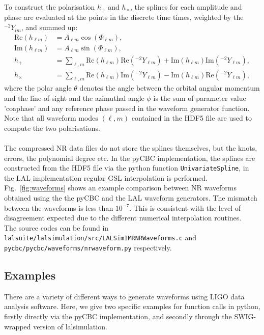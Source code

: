 \documentclass[aps,prd,amssymb,amsmath,amsfonts,superscriptaddress,
floatfix ,preprintnumbers,altaffilletter]{revtex4}
\begin{document}
To construct the polarisation $h_+$ and $h_\times$, the splines for each amplitude and phase are evaluated at the points in the discrete time times, 
weighted by the ${}^{-2}Y_{lm}$, and summed up:
\begin{align}
\label{}
    \mathrm{Re}(h_{\ell m}) &= A_{\ell m} \cos(\Phi_{\ell m}),   \\
    \mathrm{Im}(h_{\ell m}) &= A_{\ell m} \sin(\Phi_{\ell m}),   \\
    h_+ &= \sum_{\ell, m} \mathrm{Re}(h_{\ell m}) \mathrm{Re}({}^{-2}Y_{\ell m}) + \mathrm{Im}(h_{\ell m}) \mathrm{Im}({}^{-2}Y_{\ell m}), \\
    h_\times &= \sum_{\ell, m} \mathrm{Re}(h_{\ell m}) \mathrm{Im}({}^{-2}Y_{\ell m}) - \mathrm{Im}(h_{\ell m}) \mathrm{Re}({}^{-2}Y_{\ell m}),
\end{align}
where the polar angle $\theta$ denotes the angle between the orbital angular momentum and the line-of-sight and the azimuthal
angle $\phi$ is the sum of parameter value 'coa\textunderscore phase' and any reference phase passed in the waveform generator function.
\\
Note that all waveform modes $(\ell, m)$ contained in the HDF5 file are used
to compute the two polarisations. \\
\\
The compressed NR data files do not store the splines themselves, but the knots, errors, the polynomial degree etc. In the pyCBC implementation,
the splines are constructed from the HDF5 file via the python function \texttt{UnivariateSpline}, in the LAL implementation regular GSL interpolation
is performed. Fig.~\ref{fig:waveforms} shows an example comparison between NR waveforms obtained using the the pyCBC and the LAL waveform generators. The mismatch
between the waveforms is less than $10^{-7}$. This is consistent with the level of disagreement expected due to the different numerical interpolation
routines. \\
The source codes can be found in \texttt{lalsuite/lalsimulation/src/LALSimIMRNRWaveforms.c} and 
\texttt{pycbc/pycbc/waveforms/nr\textunderscore waveform.py} respectively.

\subsection{Examples}
There are a variety of different ways to generate waveforms using LIGO data analysis software. Here, we give two specific examples
for function calls in python, firstly directly via the pyCBC implementation, and secondly through the SWIG-wrapped version of 
lalsimulation. 
\end{document}

